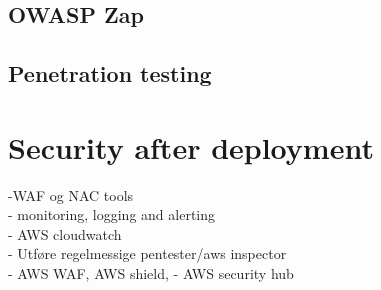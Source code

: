 \subsection{OWASP Zap}


\subsection{Penetration testing}

\section{Security after deployment}

-WAF og NAC tools \\
- monitoring, logging and alerting \\
- AWS cloudwatch \\
- Utføre regelmessige pentester/aws inspector  \\
- AWS WAF, AWS shield, 
- AWS security hub

